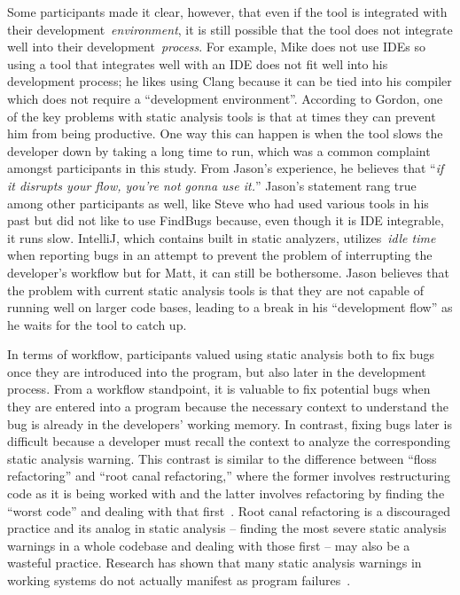 Some participants made it clear, however, that even if the tool is
integrated with their development~\emph{environment}, it is still possible that
the tool does not integrate well into their development~\emph{process}. For
example, Mike does not use IDEs so using a tool that
integrates well with an IDE does not fit well into his development process; he
likes using Clang because it can be tied into his compiler which does not
require a ``development environment''. According to Gordon, one of the key
problems with static analysis tools is that at times they can prevent him from
being productive. One way this can happen is when the tool slows the developer
down by taking a long time to run, which was a common complaint amongst participants in this study. 
From Jason's experience, he believes that ``\emph{if it disrupts
your flow, you're not gonna use it.}'' Jason's statement rang true among other
participants as well, like Steve who had used various tools in his past but did 
not like to use FindBugs because, even though it is IDE integrable, it runs
slow. IntelliJ, which contains built in static analyzers, utilizes~\emph{idle
time} when reporting bugs in an attempt to prevent the problem of interrupting
the developer's workflow but for Matt, it can still be bothersome.
Jason believes that the problem with current static analysis tools is that they
are not capable of running well on larger code bases, leading to a break in his
``development flow'' as he waits for the tool to catch up.

In terms of workflow, participants valued using static analysis both to fix bugs
once they are introduced into the program, but also later in the development
process. From a workflow standpoint, it is valuable to fix potential bugs when
they are entered into a program because the necessary context to understand the
bug is already in the developers' working memory. In contrast, fixing bugs later
is difficult because a developer must recall the context to analyze the
corresponding static analysis warning. This contrast is similar to the
difference between ``floss refactoring'' and ``root canal refactoring,'' where
the former involves restructuring code as it is being worked with and the latter
involves refactoring by finding the ``worst code'' and dealing with that
first~\cite{Murphy-Hill:2008:RefactoringTools}.
Root canal refactoring is a discouraged practice and its analog in static
analysis -- finding the most severe static analysis warnings in a whole codebase
and dealing with those first -- may also be a wasteful practice. Research has
shown that many static analysis warnings in working systems do not actually
manifest as program failures~\cite{Ayewah:2010:GFF}.


